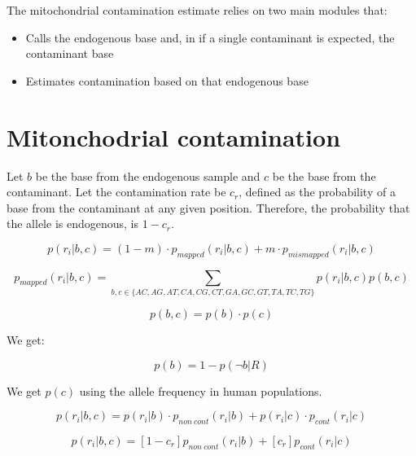 \documentclass[a4paper,12pt]{article}
\begin{document}
The mitochondrial contamination estimate relies on two main modules that:

\begin{itemize}
\item Calls the endogenous base and, in if a single contaminant is expected, the contaminant base
\item Estimates contamination based on that endogenous base
\end{itemize}

\section{Mitonchodrial contamination}

Let $b$ be the base from the endogenous sample and $c$ be the base from the contaminant. Let the contamination rate be $c_r$, defined as the probability of a base from the contaminant at any given position. Therefore, the probability that the allele is endogenous, is $1-c_r$.

\begin{equation}
p(r_i|b,c)  = (1-m) \cdot p_{mapped}(r_i|b,c) + m \cdot p_{mismapped}(r_i|b,c)  %
\end{equation}


\begin{equation}
p_{mapped}(r_i|b,c) = \sum\limits_{ b,c \in \{AC,AG,AT,CA,CG,CT,GA,GC,GT,TA,TC,TG\} } p(r_i|b,c) p(b,c)
\end{equation}

\begin{equation}
p(b,c) = p(b) \cdot p(c)
\end{equation}

\noindent We get:

\begin{equation}
p(b)  = 1 - p(\neg b|R)
\end{equation}

\noindent  We get $p(c)$ using the allele frequency in human populations.

\begin{equation}
p(r_i|b,c)  =  p(r_i|b) \cdot p_{non\ cont}(r_i|b)  +  p(r_i|c) \cdot p_{cont}(r_i|c) 
\end{equation}


\begin{equation}
p(r_i|b,c)  =  [1-c_r]  p_{non\ cont}(r_i|b) +  [c_r] p_{cont}(r_i|c) 
\end{equation}
\end{document}

